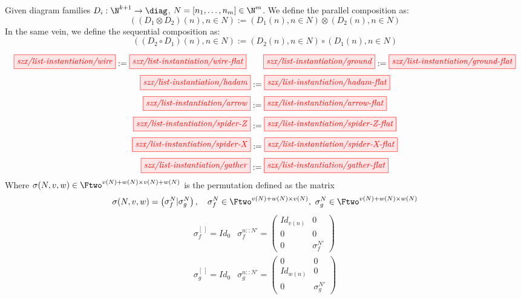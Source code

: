 \begin{definition}
    Given diagram families $D_i: \N^{k+1} \to \diag$, $N = [n_1, \dots, n_m] \in \N^m$. We define the parallel composition as:
    \[
        ((D_1 \otimes D_2)(n), n \in N) := (D_1(n), n \in N) \otimes (D_2(n), n \in N)
    \]
    In the same vein, we define the sequential composition as:
    \[
        ((D_2 \circ D_1)(n), n \in N) := (D_2(n), n \in N) \circ (D_1(n), n \in N) 
    \]
\end{definition}

\begin{table}
    \[
        \tikzfig{szx/list-instantiation/wire}
        :=
        \tikzfig{szx/list-instantiation/wire-flat}
        \qquad
        \tikzfig{szx/list-instantiation/ground}
        :=
        \tikzfig{szx/list-instantiation/ground-flat}
    \]
    \[
        \tikzfig{szx/list-instantiation/hadam}
        :=
        \tikzfig{szx/list-instantiation/hadam-flat}
    \]
    \[  %
        \tikzfig{szx/list-instantiation/arrow}
        :=
        \tikzfig{szx/list-instantiation/arrow-flat}
    \]
    \[
        \tikzfig{szx/list-instantiation/spider-Z}
        :=
        \tikzfig{szx/list-instantiation/spider-Z-flat}
    \]
    \[
        \tikzfig{szx/list-instantiation/spider-X}
        :=
        \tikzfig{szx/list-instantiation/spider-X-flat}
    \]
    \[
        \tikzfig{szx/list-instantiation/gather}
        :=
        \tikzfig{szx/list-instantiation/gather-flat}
    \]
    {\small Where $\sigma(N, v, w) \in \Ftwo^{v(N)+w(N) \times v(N)+w(N)}$ is the permutation defined as the matrix}
    \[
        \sigma(N, v, w) = \begin{pmatrix}\sigma_f^N \vert \sigma_g^N \end{pmatrix}, \quad
        \sigma_f^{N} \in \Ftwo^{v(N)+w(N) \times v(N)},
        \ \sigma_g^{N} \in \Ftwo^{v(N)+w(N) \times w(N)}
    \]
    \[
    \begin{array}{ll}
        \sigma_f^{[\,]} = Id_0
        &
        \sigma_f^{n::N'} =
            \begin{pmatrix}
                Id_{v(n)} & 0 \\
                0 & 0 \\
                0 & \sigma_f^{N'}
            \end{pmatrix}
        \\[10pt]
        \sigma_g^{[\,]} = Id_0
        &
        \sigma_g^{n::N'} =
            \begin{pmatrix}
                0 & 0 \\
                Id_{w(n)} & 0 \\
                0 & \sigma_g^{N'}
            \end{pmatrix}
    \end{array}
    \]
    \caption{Definition of the list instantiation operator.}%
    \label{tab:list-instantiation}
\end{table}

